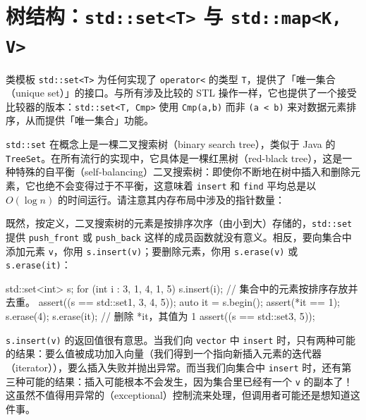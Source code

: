 \section{树结构：\texttt{std::\allowbreak{}set<\allowbreak{}T>\allowbreak{}} 与 \texttt{std::\allowbreak{}map<\allowbreak{}K,\allowbreak{} V>\allowbreak{}}}

类模板 \texttt{std::\allowbreak{}set<\allowbreak{}T>\allowbreak{}} 为任何实现了 \texttt{operator<} 的类型 \texttt{T}，提供了「唯一集合（unique set）」的接口。与所有涉及比较的 STL 操作一样，它也提供了一个接受比较器的版本：\texttt{std::\allowbreak{}set<\allowbreak{}T,\allowbreak{} Cmp>\allowbreak{}} 使用 \texttt{Cmp(\allowbreak{}a,\allowbreak{}b)\allowbreak{}} 而非 \texttt{(\allowbreak{}a < b)\allowbreak{}} 来对数据元素排序，从而提供「唯一集合」功能。

\texttt{std::\allowbreak{}set} 在概念上是一棵二叉搜索树（binary search tree），类似于 Java 的 \texttt{Tree\allowbreak{}Set}。在所有流行的实现中，它具体是一棵红黑树（red-black tree），这是一种特殊的自平衡（self-balancing）二叉搜索树：即使你不断地在树中插入和删除元素，它也绝不会变得过于不平衡，这意味着 \texttt{insert} 和 \texttt{find} 平均总是以 $O(\log n)$ 的时间运行。请注意其内存布局中涉及的指针数量：


既然，按定义，二叉搜索树的元素是按排序次序（由小到大）存储的，\texttt{std::\allowbreak{}set} 提供 \texttt{push\_\allowbreak{}front} 或 \texttt{push\_\allowbreak{}back} 这样的成员函数就没有意义。相反，要向集合中添加元素 \texttt{v}，你用 \texttt{s.\allowbreak{}insert(\allowbreak{}v)\allowbreak{}}；要删除元素，你用 \texttt{s.\allowbreak{}erase(\allowbreak{}v)\allowbreak{}} 或 \texttt{s.\allowbreak{}erase(\allowbreak{}it)\allowbreak{}}：

\begin{codebox}[cpp]
    std::set<int> s;
    for (int i : {3, 1, 4, 1, 5}) {
      s.insert(i);
    }
    // 集合中的元素按排序存放并去重。
    assert((s == std::set{1, 3, 4, 5}));
    auto it = s.begin();
    assert(*it == 1);
    s.erase(4);
    s.erase(it); // 删除 *it，其值为 1
    assert((s == std::set{3, 5}));
\end{codebox}

\texttt{s.\allowbreak{}insert(\allowbreak{}v)\allowbreak{}} 的返回值很有意思。当我们向 \texttt{vector} 中 \texttt{insert} 时，只有两种可能的结果：要么值被成功加入向量（我们得到一个指向新插入元素的迭代器（iterator）），要么插入失败并抛出异常。而当我们向集合中 \texttt{insert} 时，还有第三种可能的结果：插入可能根本不会发生，因为集合里已经有一个 \texttt{v} 的副本了！这虽然不值得用异常的（exceptional）控制流来处理，但调用者可能还是想知道这件事。

